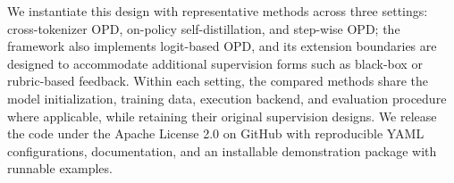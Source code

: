 We instantiate this design with representative methods across three settings: cross-tokenizer OPD, on-policy self-distillation, and step-wise OPD; the framework also implements logit-based OPD, and its extension boundaries are designed to accommodate additional supervision forms such as black-box or rubric-based feedback. Within each setting, the compared methods share the model initialization, training data, execution backend, and evaluation procedure where applicable, while retaining their original supervision designs. We release the code under the Apache License 2.0 on GitHub with reproducible YAML configurations, documentation, and an installable demonstration package with runnable examples.

